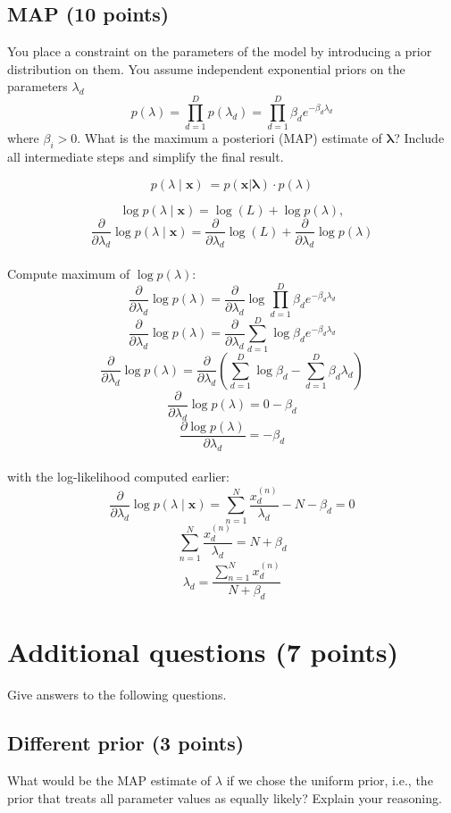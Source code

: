 \documentclass[a4paper,12pt]{article}
\begin{document}
\subsection{MAP (10 points)}
You place a constraint on the parameters of the model by introducing a prior distribution on them. You assume independent exponential priors on the parameters $\lambda_{d}$
$$
p\left(\lambda\right)= \prod_{d=1}^{D}p\left(\lambda_d\right) = \prod_{d=1}^D\beta_de^{-\beta_d \lambda_d}
$$
where $\beta_i > 0$. What is the maximum a posteriori (MAP) estimate of $\mathbf{\lambda}$?
Include all intermediate steps and simplify the final result.


\[
p(\lambda \mid \mathbf{x})\ = p(\mathbf{x} | \mathbf{\lambda}) \cdot p (\lambda)
\]

\[
\log p(\lambda \mid \mathbf{x}) = \log(L) + \log p(\lambda),
\]
\[
\frac{\partial}{\partial \lambda_d} \log p(\lambda \mid \mathbf{x}) = \frac{\partial}{\partial \lambda_d} \log(L) + \frac{\partial}{\partial \lambda_d} \log p(\lambda)
\]
\\
Compute maximum of $\log p(\lambda)$:
\[
\frac{\partial}{\partial \lambda_d} \log p(\lambda) = \frac{\partial}{\partial \lambda_d} \log \prod_{d=1}^D\beta_de^{-\beta_d \lambda_d}
\]
\[
\frac{\partial}{\partial \lambda_d} \log p(\lambda) = \frac{\partial}{\partial \lambda_d} \sum_{d=1}^D \log \beta_de^{-\beta_d \lambda_d}
\]
\[
\frac{\partial}{\partial \lambda_d} \log p(\lambda) = \frac{\partial}{\partial \lambda_d} ( \sum_{d=1}^D \log \beta_d - \sum_{d=1}^D \beta_d \lambda_d )
\]
\[
\frac{\partial}{\partial \lambda_d} \log p(\lambda) = 0 - \beta_d
\]
\[
\frac{\partial \log p(\lambda)}{\partial \lambda_d} = -\beta_d
\]
\\
with the log-likelihood computed earlier:
\[
\frac{\partial}{\partial \lambda_d} \log p(\lambda \mid \mathbf{x}) = \sum_{n=1}^{N} \frac{x_d^{(n)}}{\lambda_d} - N -\beta_d = 0
\]
\[
 \sum_{n=1}^{N} \frac{x_d^{(n)}}{\lambda_d} = N +\beta_d
\]
\[
\lambda_d = \frac{\sum_{n=1}^{N} x_d^{(n)}}{N +\beta_d}
\]

\newpage
\section{Additional questions (7 points)}
Give answers to the following questions.

\subsection{Different prior (3 points)}
What would be the MAP estimate of $\lambda$ if we chose the uniform prior, i.e., the prior that treats all parameter values as equally likely? Explain your reasoning.
\end{document}
